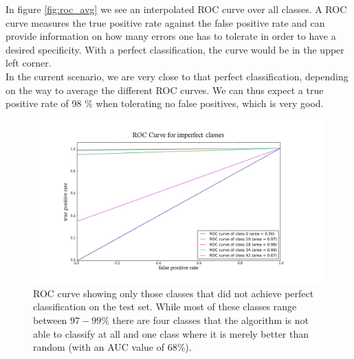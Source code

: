 \documentclass[11pt,a4paper]{article}
\begin{document}
In figure \ref{fig:roc_avg} we see an interpolated ROC curve over all classes. A ROC curve measures the true positive rate against the false positive rate and can provide information on how many errors one has to tolerate in order to have a desired specificity. With a perfect classification, the curve would be in the upper left corner.\\
In the current scenario, we are very close to that perfect classification, depending on the way to average the different ROC curves. We can thus expect a true positive rate of 98 \% when tolerating no false positives, which is very good.
\begin{figure}[h!]
	\includegraphics[width=\textwidth]{roc_imperfect.png}
	\centering
	\caption[ROC Curve for imperfect classes]{ROC curve showing only those classes that did not achieve perfect classification on the test set. While most of these classes range between $97 - 99 \%$ there are four classes that the algorithm is not able to classify at all and one class where it is merely better than random (with an AUC value of $68\%$).}
	\label{fig:roc_imp}
\end{figure}
\end{document}
